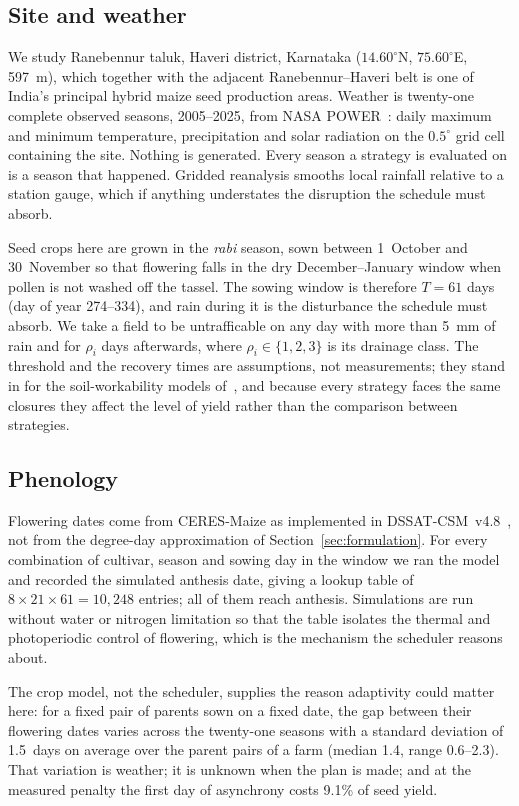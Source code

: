 \documentclass[10pt,twocolumn]{article}
\begin{document}
\subsection{Site and weather}

We study Ranebennur taluk, Haveri district, Karnataka
($14.60^\circ$N, $75.60^\circ$E, 597~m), which together with the adjacent
Ranebennur--Haveri belt is one of India's principal hybrid maize seed
production areas. Weather is twenty-one complete observed seasons,
2005--2025, from NASA POWER~\cite{power}: daily maximum and minimum
temperature, precipitation and solar radiation on the $0.5^\circ$ grid cell
containing the site. Nothing is generated. Every season a strategy is
evaluated on is a season that happened. Gridded reanalysis smooths local
rainfall relative to a station gauge, which if anything understates the
disruption the schedule must absorb.

Seed crops here are grown in the \emph{rabi} season, sown between
1~October and 30~November so that flowering falls in the dry December--January
window when pollen is not washed off the tassel. The sowing window is
therefore $T = 61$ days (day of year 274--334), and rain during it is the
disturbance the schedule must absorb. We take a field to be untrafficable
on any day with more than 5~mm of rain and for $\rho_i$ days afterwards,
where $\rho_i \in \{1,2,3\}$ is its drainage class. The threshold and the
recovery times are assumptions, not measurements; they stand in for the
soil-workability models of~\cite{bagheri2025}, and because every strategy
faces the same closures they affect the level of yield rather than the
comparison between strategies.

\subsection{Phenology}

Flowering dates come from CERES-Maize as implemented in
DSSAT-CSM~v4.8~\cite{dssat}, not from the degree-day approximation of
Section~\ref{sec:formulation}. For every combination of cultivar, season
and sowing day in the window we ran the model and recorded the simulated
anthesis date, giving a lookup table of $8 \times 21 \times 61 = 10{,}248$
entries; all of them reach anthesis. Simulations are run without water or
nitrogen limitation so that the table isolates the thermal and photoperiodic
control of flowering, which is the mechanism the scheduler reasons about.

The crop model, not the scheduler, supplies the reason adaptivity could
matter here: for a fixed pair of parents sown on a fixed date, the gap between
their flowering dates varies across the twenty-one seasons with a standard
deviation of 1.5~days on average over the parent pairs of a farm (median 1.4,
range 0.6--2.3). That variation is weather; it is unknown when the plan is
made; and at the measured penalty the first day of asynchrony costs 9.1\% of
seed yield.
\end{document}
